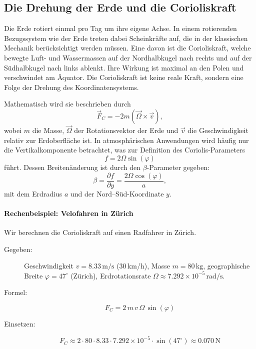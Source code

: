 \subsection{Die Drehung der Erde und die Corioliskraft}

Die Erde rotiert einmal pro Tag um ihre eigene Achse. In einem rotierenden Bezugssystem wie der Erde treten dabei Scheinkräfte auf, die in der klassischen Mechanik berücksichtigt werden müssen. Eine davon ist die {Corioliskraft}, welche bewegte Luft- und Wassermassen auf der {Nordhalbkugel} nach rechts und auf der {Südhalbkugel} nach links ablenkt. Ihre Wirkung ist maximal an den Polen und verschwindet am Äquator. Die Corioliskraft ist keine reale Kraft, sondern eine Folge der Drehung des Koordinatensystems.

Mathematisch wird sie beschrieben durch
\begin{equation}
	\vec{F}_C = -2m(\vec{\Omega} \times \vec{v}),
\label{eq:coriolis_force}
\end{equation}
wobei \(m\) die Masse, \(\vec{\Omega}\) der Rotationsvektor der Erde und \(\vec{v}\) die Geschwindigkeit relativ zur Erdoberfläche ist. In atmosphärischen Anwendungen wird häufig nur die Vertikalkomponente betrachtet, was zur Definition des {Coriolis-Parameters}
\begin{equation}
	f = 2\Omega \sin(\varphi)
\label{eq:coriolis_parameter}
\end{equation}
führt. Dessen Breitenänderung ist durch den \(\beta\)-Parameter gegeben:
\begin{equation}
	\beta = \frac{\partial f}{\partial y} = \frac{2 \Omega \cos(\varphi)}{a},
\label{eq:beta_parameter}
\end{equation}
mit dem Erdradius \(a\) und der Nord–Süd-Koordinate \(y\).

\paragraph{Rechenbeispiel: Velofahren in Zürich}

Wir berechnen die Corioliskraft auf einen Radfahrer in Zürich.

\begin{description}
	\item[Gegeben:] Geschwindigkeit \(v = 8.33\,\mathrm{m/s}\) (30\,km/h), Masse \(m = 80\,\mathrm{kg}\), geographische Breite \(\varphi = 47^\circ\) (Zürich), Erdrotationsrate \(\Omega \approx 7.292 \times 10^{-5}\,\mathrm{rad/s}\).
	\item[Formel:]
		\[
			F_C = 2\,m\,v\,\Omega\,\sin(\varphi)
		\]
	\item[Einsetzen:]
		\[
			F_C \approx 2 \cdot 80 \cdot 8.33 \cdot 7.292 \times 10^{-5} \cdot \sin(47^\circ)
			\approx 0.070\,\mathrm{N}
		\]
\end{description}

